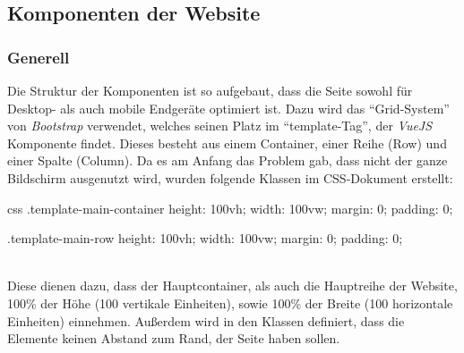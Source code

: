 \newpage
\subsection{Komponenten der Website}
\label{chapter:implementierung-frontend-komponenten}
\subsubsection{Generell}
\label{chapter:implementierung-frontend-komponenten-generell}
Die Struktur der Komponenten ist so aufgebaut, dass die Seite sowohl für Desktop- als auch mobile Endgeräte optimiert ist. Dazu wird das \enquote{Grid-System} von \textit{Bootstrap} verwendet, welches seinen Platz im \enquote{template-Tag}, der \textit{VueJS} Komponente findet. Dieses besteht aus einem Container, einer Reihe (Row) und einer Spalte (Column). Da es am Anfang das Problem gab, dass nicht der ganze Bildschirm ausgenutzt wird, wurden folgende Klassen im CSS-Dokument erstellt:
\begin{code}{css}
	.template-main-container {
		height: 100vh;
		width: 100vw;
		margin: 0;
		padding: 0;
	}
	
	.template-main-row {
		height: 100vh;
		width: 100vw;
		margin: 0;
		padding: 0;
	}
\end{code}
	\label{list:cssmaincont} ~\\
Diese dienen dazu, dass der Hauptcontainer, als auch die Hauptreihe der Website, 100\% der Höhe (100 vertikale Einheiten), sowie 100\% der Breite (100 horizontale Einheiten) einnehmen. Außerdem wird in den Klassen definiert, dass die Elemente keinen Abstand zum Rand, der Seite haben sollen.
\newpage
